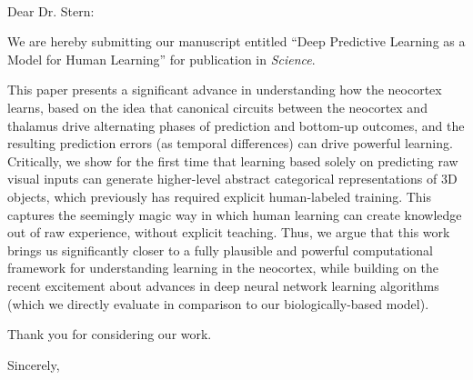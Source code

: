 \documentclass[11pt]{letter}
\begin{document}
\begin{letter}
{ \hspace*{.25in}\\}

\opening{Dear Dr. Stern:}

We are hereby submitting our manuscript entitled ``Deep Predictive Learning as a Model for Human Learning'' for publication in {\em Science}.

This paper presents a significant advance in understanding how the neocortex learns, based on the idea that canonical circuits between the neocortex and thalamus drive alternating phases of prediction and bottom-up outcomes, and the resulting prediction errors (as temporal differences) can drive powerful learning.  Critically, we show for the first time that learning based solely on predicting raw visual inputs can generate higher-level abstract categorical representations of 3D objects, which previously has required explicit human-labeled training.  This captures the seemingly magic way in which human learning can create knowledge out of raw experience, without explicit teaching.  Thus, we argue that this work brings us significantly closer to a fully plausible and powerful computational framework for understanding learning in the neocortex, while building on the recent excitement about advances in deep neural network learning algorithms (which we directly evaluate in comparison to our biologically-based model).

Thank you for considering our work.

\closing{Sincerely,}


\end{letter}
\end{document}
